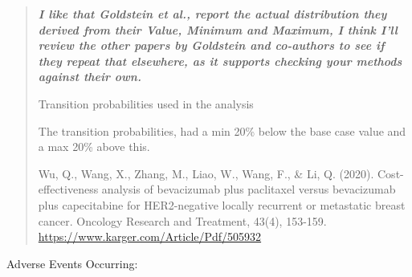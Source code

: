 \documentclass[
]{article}
\begin{document}
\begin{quote}
\textbf{\emph{I like that Goldstein et al., report the actual
distribution they derived from their Value, Minimum and Maximum, I think
I'll review the other papers by Goldstein and co-authors to see if they
repeat that elsewhere, as it supports checking your methods against
their own.}}

Transition probabilities used in the analysis

The transition probabilities, had a min 20\% below the base case value
and a max 20\% above this.

Wu, Q., Wang, X., Zhang, M., Liao, W., Wang, F., \& Li, Q. (2020).
Cost-effectiveness analysis of bevacizumab plus paclitaxel versus
bevacizumab plus capecitabine for HER2-negative locally recurrent or
metastatic breast cancer. Oncology Research and Treatment, 43(4),
153-159. \url{https://www.karger.com/Article/Pdf/505932}
\end{quote}

Adverse Events Occurring:
\end{document}
